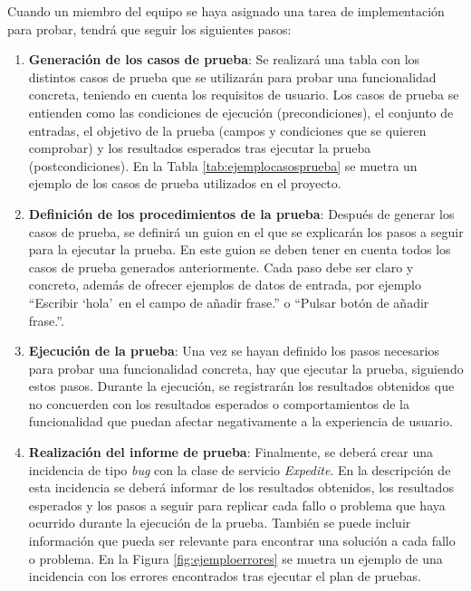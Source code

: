 Cuando un miembro del equipo se haya asignado una tarea de implementación para probar, tendrá que seguir los siguientes pasos:
\begin{enumerate}
  \item \textbf{Generación de los casos de prueba}: Se realizará una tabla con los distintos casos de prueba que se utilizarán para probar una funcionalidad concreta, teniendo en cuenta los requisitos de usuario. Los casos de prueba se entienden como las condiciones de ejecución (precondiciones), el conjunto de entradas, el objetivo de la prueba (campos y condiciones que se quieren comprobar) y los resultados esperados tras ejecutar la prueba (postcondiciones). En la Tabla \ref{tab:ejemplocasosprueba} se muetra un ejemplo de los casos de prueba utilizados en el proyecto.
  \item \textbf{Definición de los procedimientos de la prueba}: Después de generar los casos de prueba, se definirá un guion en el que se explicarán los pasos a seguir para la ejecutar la prueba. En este guion se deben tener en cuenta todos los casos de prueba generados anteriormente. Cada paso debe ser claro y concreto, además de ofrecer ejemplos de datos de entrada, por ejemplo ``Escribir `hola'\, en el campo de añadir frase.'' o ``Pulsar botón de añadir frase.''.
  \item \textbf{Ejecución de la prueba}: Una vez se hayan definido los pasos necesarios para probar una funcionalidad concreta, hay que ejecutar la prueba, siguiendo estos pasos. Durante la ejecución, se registrarán los resultados obtenidos que no concuerden con los resultados esperados o comportamientos de la funcionalidad que puedan afectar negativamente a la experiencia de usuario.
  \item \textbf{Realización del informe de prueba}: Finalmente, se deberá crear una incidencia de tipo \textit{bug} con la clase de servicio \textit{Expedite}. En la descripción de esta incidencia se deberá informar de los resultados obtenidos, los resultados esperados y los pasos a seguir para replicar cada fallo o problema que haya ocurrido durante la ejecución de la prueba. También se puede incluir información que pueda ser relevante para encontrar una solución a cada fallo o problema. En la Figura \ref{fig:ejemploerrores} se muetra un ejemplo de una incidencia con los errores encontrados tras ejecutar el plan de pruebas.
\end{enumerate}

